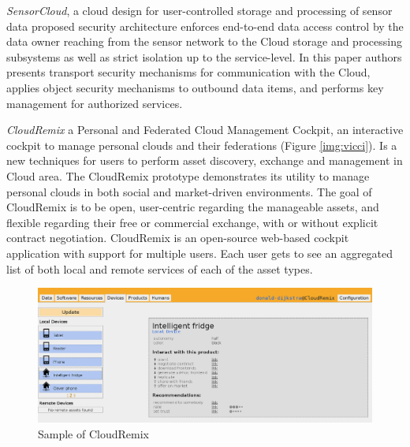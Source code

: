 	\emph{SensorCloud}\cite{hummen2012cloud}, a cloud design for user-controlled storage and processing of sensor data proposed security architecture enforces end-to-end data access control by the data owner reaching from the sensor network to the Cloud storage and processing subsystems as well as strict isolation up to the service-level. In this paper authors presents transport security mechanisms for communication with the Cloud, applies object security mechanisms to outbound data items, and performs key management for authorized services. 

	\emph{CloudRemix\cite{spillner2013personal}} a Personal and Federated Cloud Management Cockpit, an interactive cockpit to manage personal clouds and their federations (Figure \ref{img:vicci}). Is a new techniques for users to perform asset discovery, exchange and management in Cloud area. The CloudRemix prototype demonstrates its utility to manage personal clouds in both social and market-driven environments. The goal of CloudRemix is to be open, user-centric regarding the manageable assets, and flexible regarding their free or commercial exchange, with or without explicit contract negotiation. CloudRemix is an open-source web-based cockpit application with support for multiple users. Each user gets to see an aggregated list of both local and remote services of each of the asset types.
	    \begin{figure}[!ht]
		\centering
		\includegraphics[scale=0.6]{Material/examples/CloudRemix.png}   
		\caption[Sample of CloudRemix]{Sample of CloudRemix}   
		\label{img:cockpit}               
		\end{figure}
  
